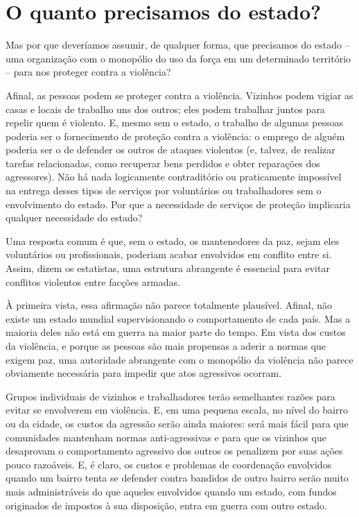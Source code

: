 \section{O quanto precisamos do estado?}

Mas por que deveríamos assumir, de qualquer forma, que precisamos do estado -- uma organização com o monopólio do uso da força em um determinado território -- para nos proteger contra a violência? 

Afinal, as pessoas podem se proteger contra a violência. Vizinhos podem vigiar as casas e locais de trabalho uns dos outros; eles podem trabalhar juntos para repelir quem é violento. E, mesmo sem o estado, o trabalho de algumas pessoas poderia ser o fornecimento de proteção contra a violência: o emprego de alguém poderia ser o de defender os outros de ataques violentos (e, talvez, de realizar tarefas relacionadas, como recuperar bens perdidos e obter reparações dos agressores). Não há nada logicamente contraditório ou praticamente impossível na entrega desses tipos de serviços por voluntários ou trabalhadores sem o envolvimento do estado. Por que a necessidade de serviços de proteção implicaria qualquer necessidade do estado?

Uma resposta comum é que, sem o estado, os mantenedores da paz, sejam eles voluntários ou profissionais, poderiam acabar envolvidos em conflito entre si. Assim, dizem os estatistas, uma estrutura abrangente é essencial para evitar conflitos violentos entre facções armadas.

À primeira vista, essa afirmação não parece totalmente plausível. Afinal, não existe um estado mundial supervisionando o comportamento de cada país. Mas a maioria deles não está em guerra na maior parte do tempo. Em vista dos custos da violência, e porque as pessoas são mais propensas a aderir a normas que exigem paz, uma autoridade abrangente com o monopólio da violência não parece obviamente necessária para impedir que atos agressivos ocorram.

Grupos individuais de vizinhos e trabalhadores terão semelhantes razões para evitar se envolverem em violência. E, em uma pequena escala, no nível do bairro ou da cidade, os custos da agressão serão ainda maiores: será mais fácil para que comunidades mantenham normas anti-agressivas e para que os vizinhos que desaprovam o comportamento agressivo dos outros os penalizem por suas ações pouco razoáveis. E, é claro, os custos e problemas de coordenação envolvidos quando um bairro tenta se defender contra bandidos de outro bairro serão muito mais administráveis do que aqueles envolvidos quando um estado, com fundos originados de impostos à sua disposição, entra em guerra com outro estado.

